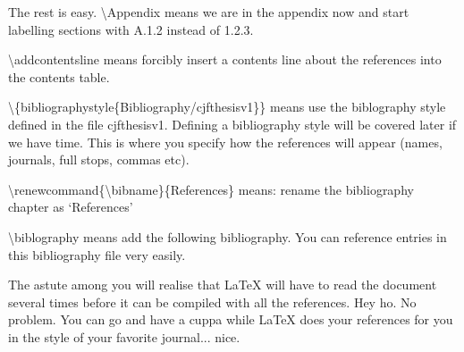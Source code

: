 The rest is easy. {\textbackslash}Appendix means we are in the appendix now and start labelling sections with A.1.2 instead of 1.2.3.  

{\textbackslash}addcontentsline means forcibly insert a contents line about the references into the contents table. 

{\textbackslash}\{bibliographystyle\{Bibliography/cjfthesisv1\}\} means use the biblography style defined in the file cjfthesisv1. Defining a bibliography style will be covered later if we have time. This is where you specify how the references will appear (names, journals, full stops, commas etc).

{\textbackslash}renewcommand\{{\textbackslash}bibname\}\{References\} means: rename the bibliography chapter as `References'

{\textbackslash}biblography means add the following bibliography.  You can reference entries in this bibliography file very easily.

The astute among you will realise that LaTeX will have to read the document several times before it can be compiled with all the references.  Hey ho. No problem. You can go and have a cuppa while LaTeX does your references for you in the style of your favorite journal... nice.



